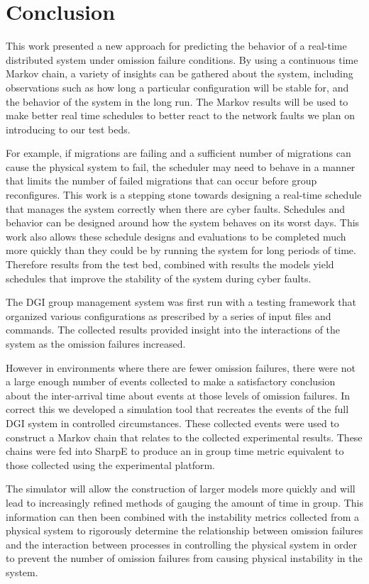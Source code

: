 \chapter{Conclusion}

This work presented a new approach for predicting the behavior of a real-time distributed system under omission failure conditions. By using a continuous time Markov chain, a variety of insights can be gathered about the system, including observations such as how long a particular configuration will be stable for, and the behavior of the system in the long run.  The Markov results will be used  to make better real time schedules to better react to the network faults we plan on introducing to our test beds. 

For example, if migrations are failing and a sufficient number of migrations can cause the physical system to fail, the scheduler may need to behave in a manner that limits the number of failed migrations that can occur before group reconfigures. This work is a stepping stone towards designing a real-time schedule that manages the system correctly when there are cyber faults. Schedules and behavior can be designed around how the system behaves on its worst days. This work also allows these schedule designs and evaluations to be completed much more quickly than they could be by running the system for long periods of time. Therefore results from the test bed, combined with results the models yield schedules that improve the stability of the system during cyber faults.

The DGI group management system was first run with a testing framework that organized various configurations as prescribed by a series of input files and commands. The collected results provided insight into the interactions of the system as the omission failures increased.

However in environments where there are fewer omission failures, there were not a large enough number of events collected to make a satisfactory conclusion about the inter-arrival time about events at those levels of omission failures. In correct this we developed a simulation tool that recreates the events of the full DGI system in controlled circumstances. These collected events were used to construct a Markov chain that relates to the collected experimental results. These chains were fed into SharpE to produce an in group time metric equivalent to those collected using the experimental platform.

The simulator will allow the construction of larger models more quickly and will lead to increasingly refined methods of gauging the amount of time in group. This information can then been combined with the instability metrics collected from a physical system to rigorously determine the relationship between omission failures and the interaction between processes in controlling the physical system in order to prevent the number of omission failures from causing physical instability in the system.

